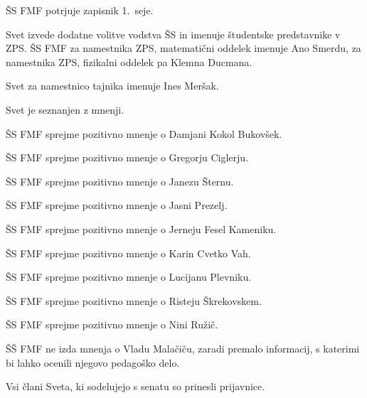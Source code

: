 \documentclass{seja}
\begin{document}
\begin{ad}
\item
\begin{sklep*}
  ŠS FMF potrjuje zapisnik 1.~seje.
\end{sklep*}

\item
Svet  izvede dodatne volitve vodstva ŠS in  imenuje študentske predstavnike v ZPS.
ŠS FMF za namestnika ZPS, matematični oddelek imenuje Ano Smerdu, za namestnika
ZPS, fizikalni oddelek pa Klemna Ducmana.

Svet za namestnico tajnika imenuje Ines Meršak.

\item
Svet je seznanjen z mnenji.

\begin{sklep*} ŠS FMF sprejme pozitivno mnenje o Damjani Kokol Bukovšek.  \end{sklep*}
\begin{sklep*} ŠS FMF sprejme pozitivno mnenje o Gregorju Ciglerju.       \end{sklep*}
\begin{sklep*} ŠS FMF sprejme pozitivno mnenje o Janezu Šternu.           \end{sklep*}
\begin{sklep*} ŠS FMF sprejme pozitivno mnenje o Jasni Prezelj.           \end{sklep*}
\begin{sklep*} ŠS FMF sprejme pozitivno mnenje o Jerneju Fesel Kameniku.  \end{sklep*}
\begin{sklep*} ŠS FMF sprejme pozitivno mnenje o Karin Cvetko Vah.        \end{sklep*}
\begin{sklep*} ŠS FMF sprejme pozitivno mnenje o Lucijanu Plevniku.       \end{sklep*}
\begin{sklep*} ŠS FMF sprejme pozitivno mnenje o Risteju Škrekovskem.     \end{sklep*}
\begin{sklep*} ŠS FMF sprejme pozitivno mnenje o Nini Ružič.              \end{sklep*}

\begin{sklep*} ŠŠ FMF ne izda mnenja o Vladu Malačiču, zaradi premalo informacij, s katerimi bi lahko ocenili njegovo pedagoško delo.        \end{sklep*}

\item
Vsi člani Sveta, ki sodelujejo s senatu so prinesli prijavnice.


\end{ad}
\end{document}
